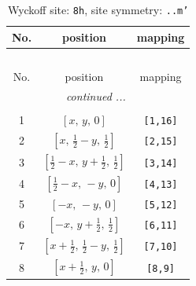 \documentclass[fleqn,8pt]{jsarticle}
\begin{document}
\begin{longtable}{ccc}
\caption{Wyckoff site: {\tt 8h}, site symmetry: {\tt ..m'}}
 \\
 \hline \hline
No. & position & mapping \\ \hline \endfirsthead

\multicolumn{2}{l}{\tablename\ \thetable{}} \\
 \hline \hline
No. & position & mapping \\ \hline \endhead

 \hline \hline
\multicolumn{2}{r}{\footnotesize\it continued ...} \\ \endfoot

 \hline \hline
\multicolumn{2}{r}{} \\ \endlastfoot

1 & $\left[ x,\, y,\, 0 \right]$ & {\tt [1,16]} \\ \hline
2 & $\left[ x,\, \frac{1}{2} - y,\, \frac{1}{2} \right]$ & {\tt [2,15]} \\ \hline
3 & $\left[ \frac{1}{2} - x,\, y + \frac{1}{2},\, \frac{1}{2} \right]$ & {\tt [3,14]} \\ \hline
4 & $\left[ \frac{1}{2} - x,\, - y,\, 0 \right]$ & {\tt [4,13]} \\ \hline
5 & $\left[ - x,\, - y,\, 0 \right]$ & {\tt [5,12]} \\ \hline
6 & $\left[ - x,\, y + \frac{1}{2},\, \frac{1}{2} \right]$ & {\tt [6,11]} \\ \hline
7 & $\left[ x + \frac{1}{2},\, \frac{1}{2} - y,\, \frac{1}{2} \right]$ & {\tt [7,10]} \\ \hline
8 & $\left[ x + \frac{1}{2},\, y,\, 0 \right]$ & {\tt [8,9]} \\
\end{longtable}
\renewcommand{\arraystretch}{1.2}
\end{document}
